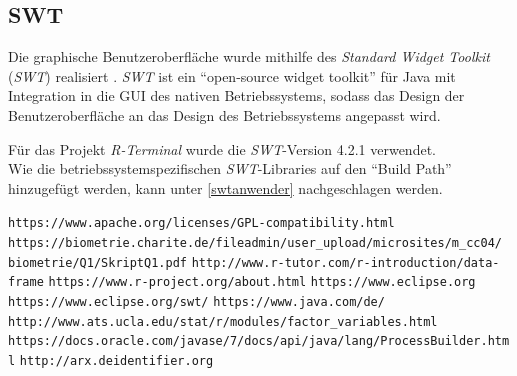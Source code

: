 \documentclass[a4paper, 12pt]{report} %
\begin{document}
\subsection{SWT}\label{swt} 
Die graphische Benutzeroberfläche wurde mithilfe des \textit{Standard Widget Toolkit} (\textit{SWT}) realisiert \cite{swt}. \textit{SWT} ist ein "`open-source widget toolkit"' für Java mit Integration in die GUI des nativen Betriebssystems, sodass das Design der Benutzeroberfläche an das Design des Betriebssystems angepasst wird. 

Für das Projekt \textit{R-Terminal} wurde die \textit{SWT}-Version 4.2.1 verwendet.\\

Wie die betriebssystemspezifischen \textit{SWT}-Libraries auf den "`Build Path"' hinzugefügt werden, kann unter \ref{swtanwender} nachgeschlagen werden.





%

%
\begin{thebibliography}{9} %
 

\texttt{https://www.apache.org/licenses/GPL-compatibility.html}
\texttt{https://biometrie.charite.de/fileadmin/user\_upload/microsites/m\_cc04/ biometrie/Q1/SkriptQ1.pdf}
\texttt{http://www.r-tutor.com/r-introduction/data-frame}
\texttt{https://www.r-project.org/about.html}
\texttt{https://www.eclipse.org}
\texttt{https://www.eclipse.org/swt/}
\texttt{https://www.java.com/de/}
\texttt{http://www.ats.ucla.edu/stat/r/modules/factor\_variables.html}
\texttt{https://docs.oracle.com/javase/7/docs/api/java/lang/ProcessBuilder.html}
\texttt{http://arx.deidentifier.org}



\end{thebibliography}
\end{document}
